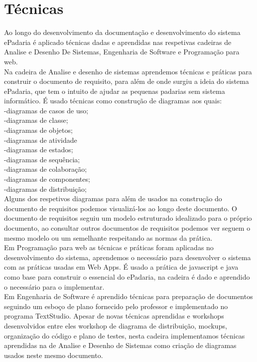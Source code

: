 \section{Técnicas}
Ao longo do desenvolvimento da documentação e desenvolvimento do sistema ePadaria é aplicado técnicas dadas e aprendidas nas respetivas cadeiras de Analise e Desenho De Sistemas, Engenharia de Software e Programação para web.\\
Na cadeira de Analise e desenho de sistemas aprendemos técnicas e práticas para construir o documento de requisito, para além de onde surgiu a ideia do sistema ePadaria, que tem o intuito de ajudar as pequenas padarias sem sistema informático. É usado técnicas como construção de diagramas aos quais:\\ 
-diagramas de casos de uso;\\ 
-diagramas de classe;\\
-diagramas de objetos;\\
-diagramas de atividade\\
-diagramas de estados;\\
-diagramas de sequência;\\
-diagramas de colaboração;\\
-diagramas de componentes;\\
-diagramas de distribuição;\\
Alguns dos respetivos diagramas para além de usados na construção do documento de requisitos podemos visualizá-los ao longo deste documento. O documento de requisitos seguiu um modelo estruturado idealizado para o próprio documento, ao consultar outros documentos de requisitos podemos ver seguem o mesmo modelo ou um semelhante respeitando as normas da prática.\\
Em Programação para web as técnicas e práticas foram aplicadas no desenvolvimento do sistema, aprendemos o necessário para desenvolver o sistema com as práticas usadas em Web Apps. É usado a prática de javascript e java como base para construir o essencial do ePadaria, na cadeira é dado e aprendido o necessário para o implementar.\\
Em Engenharia de Software é aprendido técnicas para preparação de documentos seguindo um esboço de plano fornecido pelo professor e implementado no programa TextStudio. Apesar de novas técnicas aprendidas e workshops desenvolvidos entre eles workshop de diagrama de distribuição, mockups, organização do código e plano de testes, nesta cadeira implementamos técnicas aprendidas na de Analise e Desenho de Sistemas como criação de diagramas usados neste mesmo documento.\\ 


